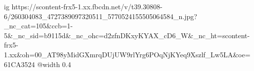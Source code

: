  
 
 
 
 

\ifcmt
  ig https://scontent-frx5-1.xx.fbcdn.net/v/t39.30808-6/260304083_4727389097320511_5770524155505064584_n.jpg?_nc_cat=105&ccb=1-5&_nc_sid=b9115d&_nc_ohc=d2zfnDKxyKYAX_cD6_W&_nc_ht=scontent-frx5-1.xx&oh=00_AT98yMidGXmrqDUjUW9rlYrg6POqNjKYeq9Xszlf_Lw5LA&oe=61CA3524
  @width 0.4
\fi
